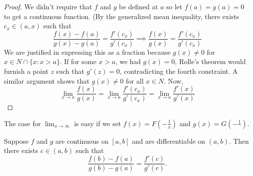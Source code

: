 \documentclass{article}
\begin{document}
\begin{proof}
  We didn't require that $f$ and $g$ be defined at $a$ so let $f(a)=g(a)=0$ to get a continuous function. (By the generalized mean inequality, there exists $c_x\in (a,x)$ such that
  $$
  \frac{f(x)-f(a)}{g(x)-g(a)}=\frac{f'(c_x)}{g'(c_x)}\implies \frac{f(x)}{g(x)}=\frac{f'(c_x)}{g'(c_x)}
  $$
  We are justified in expressing this as a fraction because $g(x)\neq 0$ for $x\in N\cap\{x:x>a\}$. If for some $x>a$, we had $g(x)=0$, Rolle's theorem would furnish a point $z$ such that $g'(z)=0$, contradicting the fourth constraint. A similar argument shows that $g(x)\neq 0$ for all $x\in N$. Now,
  $$
  \lim_{x\to a}\frac{f(x)}{g(x)}=\lim_{x\to a}\frac{f'(c_x)}{g'(c_x)}=\lim_{x\to a}\frac{f'(x)}{g'(x)}
  $$
\end{proof}
The case for $\lim_{x\to\infty}$ is easy if we set $f(x)=F(-\frac{1}{x})$ and $g(x)=G(-\frac{1}{})$.
\begin{theorem}
  Suppose $f$ and $g$ are continuous on $[a,b]$ and are differentiable on $(a,b)$. Then there exists $c\in (a,b)$ such that
  $$
  \frac{f(b)-f(a)}{g(b)-g(a)}=\frac{f'(c)}{g'(c)}.
  $$
\end{theorem}
\end{document}
